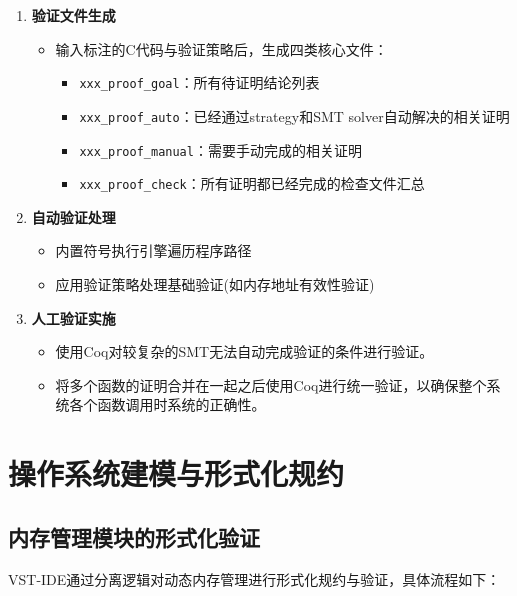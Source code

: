 \begin{enumerate}
    \item \textbf{验证文件生成}
    \begin{itemize}
        \item 输入标注的C代码与验证策略后，生成四类核心文件：
        \begin{itemize}
            \item \texttt{xxx\_proof\_goal}：所有待证明结论列表
            \item \texttt{xxx\_proof\_auto}：已经通过strategy和SMT solver自动解决的相关证明
            \item \texttt{xxx\_proof\_manual}：需要手动完成的相关证明
            \item \texttt{xxx\_proof\_check}：所有证明都已经完成的检查文件汇总
        \end{itemize}
    \end{itemize}

    \item \textbf{自动验证处理}
    \begin{itemize}
        \item 内置符号执行引擎遍历程序路径
        \item 应用验证策略处理基础验证(如内存地址有效性验证)
    \end{itemize}

    \item \textbf{人工验证实施}
    \begin{itemize}
        \item 使用Coq对较复杂的SMT无法自动完成验证的条件进行验证。
        \item 将多个函数的证明合并在一起之后使用Coq进行统一验证，以确保整个系统各个函数调用时系统的正确性。
    \end{itemize}
\end{enumerate}

\section{操作系统建模与形式化规约}
\subsection{内存管理模块的形式化验证}

\noindent VST-IDE通过分离逻辑对动态内存管理进行形式化规约与验证，具体流程如下：

